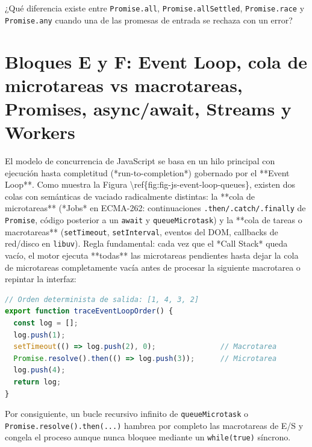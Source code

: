 \documentclass{book}
\begin{document}
\begin{tcolorbox}[title={Autoficha}, studiumcheck, breakable]

¿Qué diferencia existe entre \texttt{Promise.all}, \texttt{Promise.allSettled}, \texttt{Promise.race} y \texttt{Promise.any} cuando una de las promesas de entrada se rechaza con un error?
\end{tcolorbox}

\section{Bloques E y F: Event Loop, cola de microtareas vs macrotareas, Promises, async/await, Streams y Workers}

El modelo de concurrencia de JavaScript se basa en un hilo principal con ejecución hasta completitud (*run-to-completion*) gobernado por el **Event Loop**. Como muestra la Figura \textbackslash{}ref\{fig:fig-js-event-loop-queues\}, existen dos colas con semánticas de vaciado radicalmente distintas: la **cola de microtareas** (*Jobs* en ECMA-262: continuaciones \texttt{.then/.catch/.finally} de \texttt{Promise}, código posterior a un \texttt{await} y \texttt{queueMicrotask}) y la **cola de tareas o macrotareas** (\texttt{setTimeout}, \texttt{setInterval}, eventos del DOM, callbacks de red/disco en \texttt{libuv}). Regla fundamental: cada vez que el *Call Stack* queda vacío, el motor ejecuta **todas** las microtareas pendientes hasta dejar la cola de microtareas completamente vacía antes de procesar la siguiente macrotarea o repintar la interfaz:
\begin{lstlisting}[style=studium,language={JavaScript}]
// Orden determinista de salida: [1, 4, 3, 2]
export function traceEventLoopOrder() {
  const log = [];
  log.push(1);
  setTimeout(() => log.push(2), 0);               // Macrotarea
  Promise.resolve().then(() => log.push(3));      // Microtarea
  log.push(4);
  return log;
}
\end{lstlisting}
Por consiguiente, un bucle recursivo infinito de \texttt{queueMicrotask} o \texttt{Promise.resolve().then(...)} hambrea por completo las macrotareas de E/S y congela el proceso aunque nunca bloquee mediante un \texttt{while(true)} síncrono.
\end{document}
